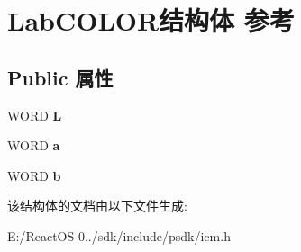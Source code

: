 \hypertarget{struct_lab_c_o_l_o_r}{}\section{Lab\+C\+O\+L\+O\+R结构体 参考}
\label{struct_lab_c_o_l_o_r}
\subsection*{Public 属性}
\begin{DoxyCompactItemize}
\item 
\mbox{\label{struct_lab_c_o_l_o_r_a19a7ad8d18793150e3c91eaf4d9ca2ce}} 
W\+O\+RD {\bfseries L}
\item 
\mbox{\label{struct_lab_c_o_l_o_r_ae61fc2d677ce95140640f8869f1577d7}} 
W\+O\+RD {\bfseries a}
\item 
\mbox{\label{struct_lab_c_o_l_o_r_aaaadadbd9a2f3a2dfaadba8356606675}} 
W\+O\+RD {\bfseries b}
\end{DoxyCompactItemize}


该结构体的文档由以下文件生成\+:\begin{DoxyCompactItemize}
\item 
E\+:/\+React\+O\+S-\/0../sdk/include/psdk/icm.\+h\end{DoxyCompactItemize}
